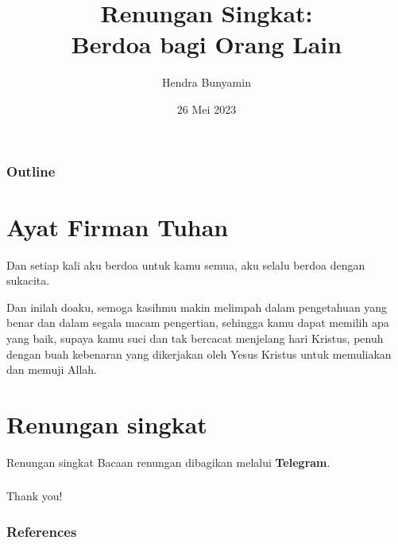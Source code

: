 \documentclass{beamer}
\title[Renungan Singkat]{%
    Renungan Singkat: \\
    Berdoa bagi Orang Lain \\ \citep{warren2023renungan}
    \vspace{0.5cm}
}
\author{Hendra Bunyamin}
\institute{
        \textit{Program Studi Teknik Informatika}\\
        \textit{Universitas Kristen Maranatha}
        \vspace{0.5cm}
}
\date[Venue and Date]{%
    26 Mei 2023
}
\begin{document}

{
    \maketitle
}

\begin{frame}
\frametitle{Outline}
\tableofcontents
\end{frame}


\section{Ayat Firman Tuhan}
\begin{frame}{}
	\Large
	\begin{tcolorbox}[colback=green!5,colframe=green!40!black,title=Filipi 1:4 (TB)]
		Dan setiap kali aku berdoa untuk kamu semua, aku selalu berdoa dengan sukacita.
	\end{tcolorbox}
\end{frame}

\begin{frame}{}
	\begin{tcolorbox}[colback=green!5,colframe=green!40!black,title=Filipi 1:9-11 (TB)]
Dan inilah doaku, semoga kasihmu makin melimpah dalam pengetahuan yang benar dan dalam segala macam pengertian, sehingga kamu dapat memilih apa yang baik, supaya kamu suci dan tak bercacat menjelang hari Kristus, penuh dengan buah kebenaran yang dikerjakan oleh Yesus Kristus untuk memuliakan dan memuji Allah.
	\end{tcolorbox}
\end{frame}

\section{Renungan singkat}
\begin{frame}{Renungan singkat}
	Bacaan renungan dibagikan melalui \textbf{Telegram}.
\end{frame}





\begin{frame}
    \frametitle{}
    \centering
    
    \LARGE\color{oxfordblue}
    Thank you!

\end{frame}

\begin{frame}
\frametitle{References}
\small
\end{frame}

\end{document}
